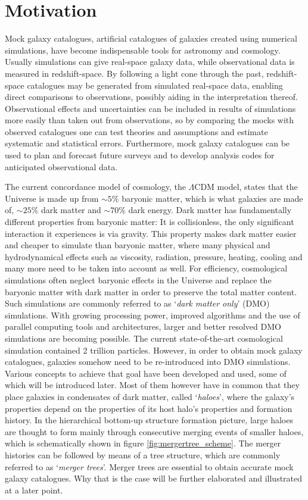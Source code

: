 \section{Motivation}

Mock galaxy catalogues, artificial catalogues of galaxies created using numerical simulations, have become indispensable tools for astronomy and cosmology.
Usually simulations can give real-space galaxy data, while observational data is measured in redshift-space.
By following a light cone through the past, redshift-space catalogues may be generated from simulated real-space data, enabling direct comparisons to observations, possibly aiding in the interpretation thereof.
Observational effects and uncertainties can be included in results of simulations more easily than taken out from observations, so by comparing the mocks with observed catalogues one can test theories and assumptions and estimate systematic and statistical errors.
Furthermore, mock galaxy catalogues can be used to plan and forecast future surveys and to develop analysis codes for anticipated observational data.

The current concordance model of cosmology, the $\Lambda$CDM model, states that the Universe is made up from $\sim 5\%$ baryonic matter, which is what galaxies are made of, $\sim 25\%$ dark matter and $\sim 70\%$ dark energy.
Dark matter has fundamentally different properties from baryonic matter:
It is collisionless, the only significant interaction it experiences is via gravity.
This property makes dark matter easier and cheaper to simulate than baryonic matter, where many physical and hydrodynamical effects such as viscosity, radiation, pressure, heating, cooling and many more need to be taken into account as well.
For efficiency, cosmological simulations often neglect baryonic effects in the Universe and replace the baryonic matter with dark matter in order to preserve the total matter content.
Such simulations are commonly referred to as `\emph{dark matter only}' (DMO) simulations.
With growing processing power, improved algorithms and the use of parallel computing tools and architectures, larger and better resolved DMO simulations are becoming possible.
The current state-of-the-art cosmological simulation \parencite{PKDGRAV} contained 2 trillion particles.
However, in order to obtain mock galaxy catalogues, galaxies somehow need to be re-introduced into DMO simulations.
Various concepts to achieve that goal have been developed and used, some of which will be introduced later.
Most of them however have in common that they place galaxies in condensates of dark matter, called `\emph{haloes}', where the galaxy's properties depend on the properties of its host halo's properties and formation history.
In the hierarchical bottom-up structure formation picture, large haloes are thought to form mainly through consecutive merging events of smaller haloes, which is schematically shown in figure \ref{fig:mergertree_scheme}.
The merger histories can be followed by means of a tree structure, which are commonly referred to as `\emph{merger trees}'.
Merger trees are essential to obtain accurate mock galaxy catalogues.
Why that is the case will be further elaborated and illustrated at a later point.


